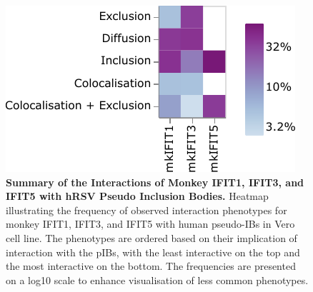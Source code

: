 \begin{figure}
    \centering
    \includegraphics[width=0.6\linewidth]{09. Chapter 4/Figs/heatmap-vero-hnhp-i135.pdf}
    \caption[Summary of the Interactions of Monkey IFIT1, IFIT3, and IFIT5 with hRSV Pseudo Inclusion Bodies.]{\textbf{Summary of the Interactions of Monkey IFIT1, IFIT3, and IFIT5 with hRSV Pseudo Inclusion Bodies.} Heatmap illustrating the frequency of observed interaction phenotypes for monkey IFIT1, IFIT3, and IFIT5 with human pseudo-IBs in Vero cell line. The phenotypes are ordered based on their implication of interaction with the pIBs, with the least interactive on the top and the most interactive on the bottom. The frequencies are presented on a log10 scale to enhance visualisation of less common phenotypes.}
    \label{fig:Summary of the Interactions of Monkey IFIT1, IFIT3, and IFIT5 with hRSV Pseudo Inclusion Bodies}
\end{figure}

